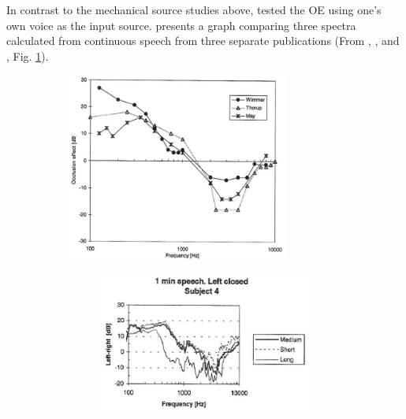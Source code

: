 In contrast to the mechanical source studies above, \cite{hansen:97b} tested the OE using one's own voice as the input source.  \cite{hansen:97b} presents a graph comparing three spectra calculated from continuous speech from three separate publications (From \cite{wimmer:86}, \cite{thorup:96}, and \cite{may:92}, Fig. \ref{fig:hansenAverageOEa}).  
%
\begin{figure}
\begin{subfigure}{0.45\textwidth}
  \centering
  \includegraphics[width=0.8\textwidth]{figure/hansenAverageOE.png}
  \caption{ }
  \label{fig:hansenAverageOEa}
\end{subfigure}%
\hfill
\begin{subfigure}{0.5\textwidth}
  \begin{subfigure}{0.8\textwidth}
    \centering
    \includegraphics[width=1\textwidth]{figure/Hansen_OE-plot_a.png}

\end{subfigure}
\end{subfigure}
\end{figure}
